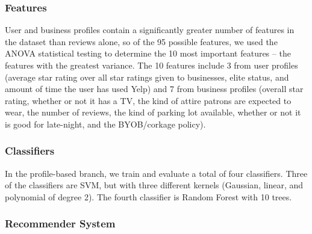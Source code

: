 \subsubsection{Features}
User and business profiles contain a significantly greater number of features in the dataset than reviews alone, so of the 95 possible features, we used the ANOVA statistical testing to determine the 10 most important features -- the features with the greatest variance. The 10 features include 3 from user profiles (average star rating over all star ratings given to businesses, elite status, and amount of time the user has used Yelp) and 7 from business profiles (overall star rating, whether or not it has a TV, the kind of attire patrons are expected to wear, the number of reviews, the kind of parking lot available, whether or not it is good for late-night, and the BYOB/corkage policy).

\subsubsection{Classifiers}
In the profile-based branch, we train and evaluate a total of four classifiers. Three of the classifiers are SVM, but with three different kernels (Gaussian, linear, and polynomial of degree 2). The fourth classifier is Random Forest with 10 trees.

\subsubsection{Recommender System}